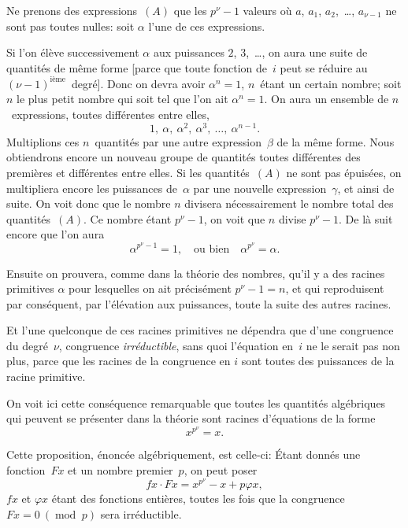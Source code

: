 \documentclass[leqno,12pt]{book}[2005/09/16]
\newcommand{\Eq}[1]{\ensuremath{#1}}
\renewcommand{\phi}{\varphi}
\DeclareMathOperator{\Mod}{mod\;}
\renewcommand{\mod}{\Mod}
\begin{document}
Ne prenons des expressions~\Eq{(A)} que les $p^{\nu} - 1$ valeurs où $a$,
$a_{1}$, $a_{2}$,~\dots, $a_{\nu-1}$ ne sont pas toutes nulles: soit $\alpha$ l'une de ces
expressions.

Si l'on élève successivement $\alpha$ aux puissances $2$\ieme, $3$\ieme,~\dots, on
aura une suite de quantités de même forme [parce que toute
fonction de~$i$ peut se réduire au $(\nu - 1)^\text{ième}$~degré]. Donc on devra
avoir $\alpha^{n} = 1$, $n$~étant un certain nombre; soit $n$ le plus petit
nombre qui soit tel que l'on ait $\alpha^{n} = 1$. On aura un ensemble
de $n$~expressions, toutes différentes entre elles,
\[
1,\ \alpha,\ \alpha^{2},\ \alpha^{3},\ \dots,\ \alpha^{n-1}.
\]
Multiplions ces $n$~quantités par une autre expression~$\beta$ de la même
forme. Nous obtiendrons encore un nouveau groupe de quantités
toutes différentes des premières et différentes entre elles. Si les
quantités~\Eq{(A)} ne sont pas épuisées, on multipliera encore les
puissances de~$\alpha$ par une nouvelle expression~$\gamma$, et ainsi de suite.
On voit donc que le nombre $n$ divisera nécessairement le nombre
total des quantités~\Eq{(A)}. Ce nombre étant $p^{\nu} - 1$, on voit que $n$
divise $p^{\nu} - 1$. De là suit encore que l'on aura
\[
\alpha^{p^{\nu}-1}\! = 1, \quad\text{ou bien}\quad
\alpha^{p^{\nu}}\! = \alpha.
\]

Ensuite on prouvera, comme dans la théorie des nombres, qu'il
y a des racines primitives $\alpha$ pour lesquelles on ait précisément
$p^{\nu} - 1 = n$, et qui reproduisent par conséquent, par l'élévation
aux puissances, toute la suite des autres racines.

Et l'une quelconque de ces racines primitives ne dépendra que
d'une congruence du degré~$\nu$, congruence \emph{irréductible}, sans quoi
l'équation en~$i$ ne le serait pas non plus, parce que les racines de
la congruence en $i$ sont toutes des puissances de la racine primitive.

On voit ici cette conséquence remarquable que toutes les quantités
algébriques qui peuvent se présenter dans la théorie sont
racines d'équations de la forme
\[
x^{p^{\nu}}\! = x.
\]

Cette proposition, énoncée algébriquement, est celle-ci: Étant
donnés une fonction~$Fx$ et un nombre premier~$p$, on peut poser
\[
fx · Fx = x^{p^{\nu}}\! - x + p \phi x,
\]
$fx$ et $\phi x$ étant des fonctions entières, toutes les fois que la congruence
$Fx = 0\ (\mod p)$ sera irréductible.
\end{document}
